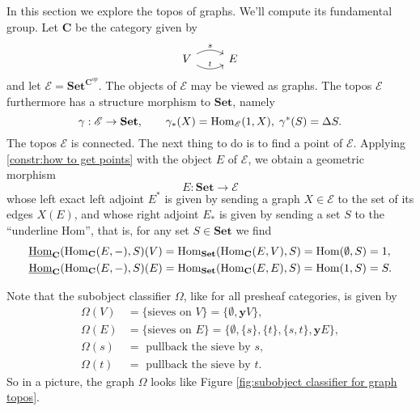 In this section we explore the topos of graphs. We'll compute its fundamental group. Let $\mathbf{C}$ be the category given by
\[ \begin{tikzcd}
 V \arrow[r, bend left, "s"] \arrow[r, bend right, "t"] & E
\end{tikzcd} \]
and let $\mathscr{E} = \mathbf{Set}^{\mathbf{C}^{op}}$. The objects of $\mathscr{E}$ may be viewed as graphs. The topos $\mathscr{E}$ furthermore has a structure morphism to $\mathbf{Set}$, namely
\[ \gamma : \mathscr{E} \to \mathbf{Set}, \qquad \gamma_*(X) = \operatorname{Hom}_{\mathscr{E}}(1,X), \; \gamma^*(S) = \Delta S. \]
The topos $\mathscr{E}$ is connected. The next thing to do is to find a point of $\mathscr{E}$. Applying \cref{constr:how to get points} with the object $E$ of $\mathscr{E}$, we obtain a geometric morphism
\[  E : \mathbf{Set} \to \mathscr{E} \]
whose left exact left adjoint $E^*$ is given by sending a graph $X \in \mathscr{E}$ to the set of its edges $X(E)$, and whose right adjoint $E_*$ is given by sending a set $S$ to the ``underline Hom'', that is, for any set $S \in \mathbf{Set}$ we find
\begin{align*}
\underline{\operatorname{Hom}}_{\mathbf{C}}(\operatorname{Hom}_{\mathbf{C}}(E, -), S)(V) &= \operatorname{Hom}_{\mathbf{Set}}(\operatorname{Hom}_{\mathbf{C}}(E,V), S) = \operatorname{Hom}(\emptyset, S) = 1, \\
\underline{\operatorname{Hom}}_{\mathbf{C}}(\operatorname{Hom}_{\mathbf{C}}(E, -), S)(E) &= \operatorname{Hom}_{\mathbf{Set}}(\operatorname{Hom}_{\mathbf{C}}(E,E), S) = \operatorname{Hom}(1, S) = S.
\end{align*}

Note that the subobject classifier $\Omega$, like for all presheaf categories, is given by
\begin{align*}
\Omega(V) &= \{ \text{sieves on } V \} = \{\emptyset, \mathbf{y}V \}, \\
\Omega(E) &= \{ \text{sieves on } E \} = \{\emptyset, \{s\}, \{t\}, \{s,t\}, \mathbf{y}E \}, \\
\Omega(s) &= \text{ pullback the sieve by } s, \\
\Omega(t) &= \text{ pullback the sieve by } t.
\end{align*}
So in a picture, the graph $\Omega$ looks like Figure \ref{fig:subobject classifier for graph topos}.

